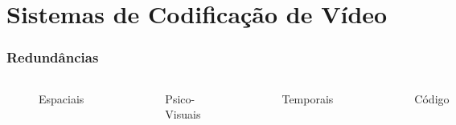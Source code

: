 \documentclass{beamer}
\begin{document}
\section{Sistemas de Codificação de Vídeo}


\begin{frame}
       \frametitle{Redundâncias}
       \begin{columns}
                     \begin{figure}[h]
                            \centering
                            
                            \caption{Espaciais}
                     \end{figure}
                     \begin{figure}[h]
                            \centering
                            
                            \caption{Psico-Visuais}
                     \end{figure}
                     \begin{figure}[h]
                            \centering
                            
                            \caption{Temporais}
                     \end{figure}
                     \begin{figure}[h]
                            \centering
                            
                            \caption{Código}
                     \end{figure}
       \end{columns}
\end{frame}
\end{document}
